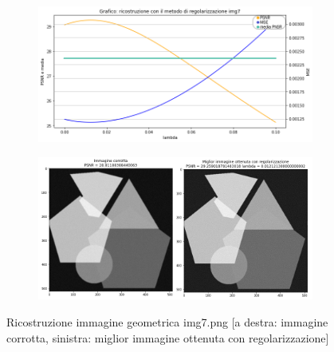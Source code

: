 \begin{figure}[H]
    \begin{subfigure}{0.5\textwidth}
        \includegraphics[width=\textwidth]{imgRicostruzione/grafico7minimize.png}
    \end{subfigure}%
    \begin{subfigure}{0.5\textwidth}
        \centering
        \includegraphics[width=\textwidth]{imgRicostruzione/ricostruzione7minimize.png}
    \end{subfigure}
    \caption{Ricostruzione immagine geometrica img7.png [a destra: immagine corrotta, sinistra: miglior immagine ottenuta con regolarizzazione]}


\end{figure}
